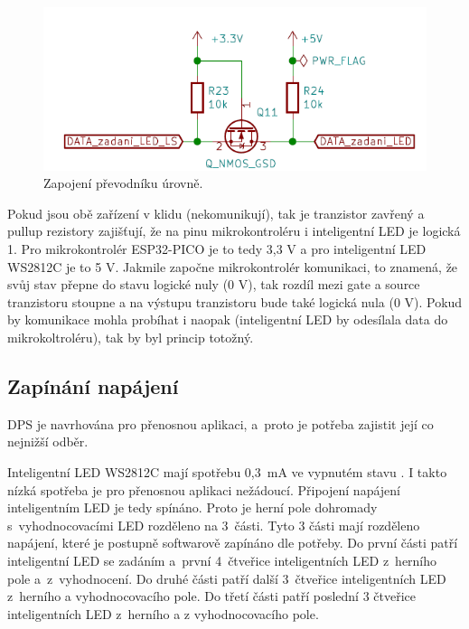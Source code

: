   \begin{figure}[!h]
    \begin{center}
      \includegraphics[scale=0.9]{obrazky/level_shifter.png}
    \end{center}
    \caption[Zapojení převodníků úrovně]{Zapojení převodníku úrovně.}
  \end{figure}

  Pokud jsou obě zařízení v klidu (nekomunikují), tak je tranzistor zavřený a pullup rezistory zajišťují, že na pinu mikrokontroléru
  i inteligentní LED je logická 1. Pro mikrokontrolér ESP32-PICO je to tedy 3,3 V a pro inteligentní LED WS2812C je to 5 V. Jakmile započne
  mikrokontrolér komunikaci, to znamená, že svůj stav přepne do stavu logické nuly (0 V), tak rozdíl mezi gate a source tranzistoru stoupne
  a na výstupu tranzistoru bude také logická nula (0 V). Pokud by komunikace mohla probíhat i naopak (inteligentní LED by odesílala data do
  mikrokoltroléru), tak by byl princip totožný. 

  \subsection{Zapínání napájení}
  DPS je navrhována pro přenosnou aplikaci, a~proto je potřeba zajistit její co nejnižší odběr. 

  Inteligentní LED WS2812C mají spotřebu 0,3~mA ve vypnutém stavu \cite{WS2812C_datasheet}. I takto nízká spotřeba je  pro přenosnou aplikaci 
  nežádoucí. Připojení
  napájení inteligentním LED je tedy spínáno. Proto je herní pole dohromady
  s~vyhodnocovacími LED rozděleno na 3~části. Tyto 3 části mají rozděleno napájení, které je postupně softwarově zapínáno dle potřeby. 
  Do první části patří inteligentní LED se zadáním a~první 4~čtveřice inteligentních LED 
  z~herního pole a~z~vyhodnocení. Do druhé části patří další 3~čtveřice inteligentních LED z~herního a vyhodnocovacího pole. 
  Do třetí části patří poslední 3 čtveřice inteligentních LED z~herního a z vyhodnocovacího pole.

